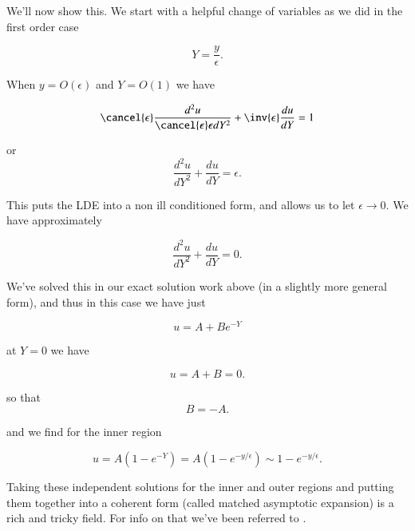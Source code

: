 We'll now show this.  We start with a helpful change of variables as we did in the first order case

\begin{equation}\label{eqn:continuumL20:710}
Y = \frac{y}{\epsilon}.
\end{equation}

When $y = O(\epsilon)$ and $Y = O(1)$ we have

\begin{equation}\label{eqn:continuumL20:730}
\cancel{\epsilon} \frac{d^2 u}{\cancel{\epsilon} \epsilon dY^2} + \inv{\epsilon} \frac{du}{dY} = 1
\end{equation}

or
\begin{equation}\label{eqn:continuumL20:750}
\frac{d^2 u}{dY^2} + \frac{du}{dY} = \epsilon.
\end{equation}

This puts the LDE into a non ill conditioned form, and allows us to let $\epsilon \rightarrow 0$.  We have approximately

\begin{equation}\label{eqn:continuumL20:770}
\frac{d^2 u}{dY^2} + \frac{du}{dY} = 0.
\end{equation}

We've solved this in our exact solution work above (in a slightly more general form), and thus in this case we have just

\begin{equation}\label{eqn:continuumL20:830}
u = A + B e^{-Y}
\end{equation}

at $Y = 0$ we have

\begin{equation}\label{eqn:continuumL20:850}
u = A + B = 0.
\end{equation}

so that
\begin{equation}\label{eqn:continuumL20:870}
B = -A.
\end{equation}

and we find for the inner region

\begin{equation}\label{eqn:continuumL20:890}
u = A (1 - e^{-Y}) = A( 1 - e^{-y/\epsilon} ) \sim 1 - e^{-y/\epsilon}.
\end{equation}

Taking these independent solutions for the inner and outer regions and putting them together into a coherent form (called matched asymptotic expansion) is a rich and tricky field.  For info on that we've been referred to \cite{hinch1991perturbation}.

\EndArticle
